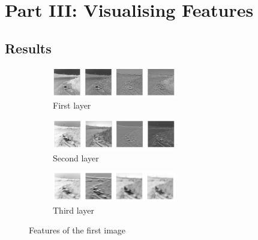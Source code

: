 \documentclass{article}
\begin{document}
    \section{Part III: Visualising Features}

    \subsection{Results}
    \begin{figure}[h!]
        \centering
        \begin{subfigure}[t]{0.6\textwidth}
            \centering
            \includegraphics[width=0.6\textwidth]{image1_layer1}
            \caption{First layer}
            \label{pic1}
        \end{subfigure}
        \begin{subfigure}[t]{0.6\textwidth}
            \centering
            \includegraphics[width=0.6\textwidth]{image1_layer2}
            \caption{Second layer}
        \end{subfigure}
        \begin{subfigure}[t]{0.6\textwidth}
            \centering
            \includegraphics[width=0.6\textwidth]{image1_layer3}
            \caption{Third layer}
        \end{subfigure}
        \caption{Features of the first image}
    \end{figure}
\end{document}
